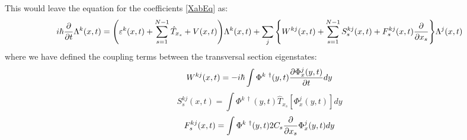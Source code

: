 \documentclass[11pt, a4paper]{article} %
\begin{document}
This would leave the equation for the coefficients \eqref{XabEq} as:
\begin{equation}\label{XabEq}
i\hbar \pdv{}{t}\Lambda^k(x,t) = \qty( \varepsilon^k(x,t) + \sum_{s=1}^{N-1}\hat{T}_{x_s}+V(x,t))\Lambda^k(x,t)+ \sum_j \qty{ W^{kj}(x,t) + \sum_{s=1}^{N-1} S^{kj}_s(x,t)+F^{kj}_s(x,t)\pdv{}{x_s} } \Lambda^j(x,t) 
\end{equation}
where we have defined the coupling terms between the transversal section eigenstates:
\begin{equation}
W^{kj}(x,t) = -i\hbar\int \Phi^{k\ \dagger}(y,t) \pdv{\Phi^j_x(y,t)}{t} dy
\end{equation}
\begin{equation}
S^{kj}_s(x,t) = \int \Phi^{k\ \dagger}(y,t) \hat{T}_{x_s} [\Phi^j_x(y,t)] dy
\end{equation}
\begin{equation}
F^{kj}_s(x,t) = \int \Phi^{k\ \dagger}(y,t) 2C_s \pdv{}{x_s}\Phi^j_x(y,t) dy
\end{equation}
\end{document}
